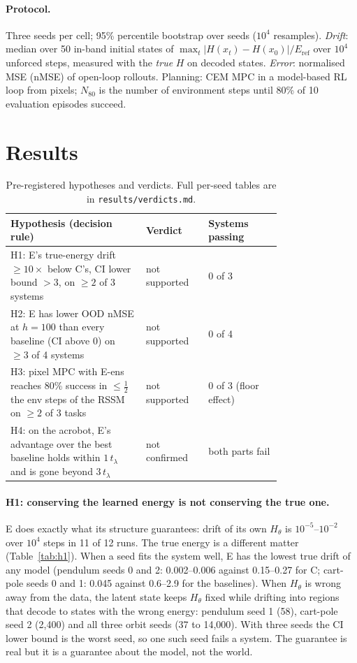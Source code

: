 \documentclass[10pt]{article}
\newcommand{\E}{\textsc{E}}
\begin{document}
\paragraph{Protocol.} Three seeds per cell; 95\% percentile bootstrap over seeds ($10^4$ resamples).
\emph{Drift}: median over 50 in-band initial states of $\max_t |H(x_t)-H(x_0)|/E_\text{ref}$ over $10^4$
unforced steps, measured with the \emph{true} $H$ on decoded states. \emph{Error}: normalised MSE (nMSE)
of open-loop rollouts. Planning: CEM \citep{deboer2005cem} MPC in a model-based RL loop from pixels;
$N_{80}$ is the number of environment steps until 80\% of 10 evaluation episodes succeed.

\section{Results}

\begin{table}[t]
\centering
\small
\caption{Pre-registered hypotheses and verdicts. Full per-seed tables are in \texttt{results/verdicts.md}.}
\label{tab:verdicts}
\begin{tabular}{@{}p{0.5\linewidth}lp{0.27\linewidth}@{}}
\toprule
Hypothesis (decision rule) & Verdict & Systems passing \\
\midrule
H1: \E's true-energy drift $\ge 10\times$ below C's, CI lower bound $>3$, on $\ge 2$ of 3 systems &
not supported & 0 of 3 \\
H2: \E{} has lower OOD nMSE at $h=100$ than every baseline (CI above 0) on $\ge 3$ of 4 systems &
not supported & 0 of 4 \\
H3: pixel MPC with \E-ens reaches 80\% success in $\le\tfrac12$ the env steps of the RSSM on $\ge 2$ of 3 tasks &
not supported & 0 of 3 (floor effect) \\
H4: on the acrobot, \E's advantage over the best baseline holds within $1\,t_\lambda$ and is gone beyond $3\,t_\lambda$ &
not confirmed & both parts fail \\
\bottomrule
\end{tabular}
\end{table}

\paragraph{H1: conserving the learned energy is not conserving the true one.} \E{} does exactly what its
structure guarantees: drift of its own $H_\theta$ is $10^{-5}$--$10^{-2}$ over $10^4$ steps in 11 of 12
runs. The true energy is a different matter (Table~\ref{tab:h1}). When a seed fits the system well, \E{}
has the lowest true drift of any model (pendulum seeds 0 and 2: 0.002--0.006 against 0.15--0.27 for C;
cart-pole seeds 0 and 1: 0.045 against 0.6--2.9 for the baselines). When $H_\theta$ is wrong away from
the data, the latent state keeps $H_\theta$ fixed while drifting into regions that decode to states with
the wrong energy: pendulum seed 1 (58), cart-pole seed 2 (2,400) and all three orbit seeds (37 to
14,000). With three seeds the CI lower bound is the worst seed, so one such seed fails a system. The
guarantee is real but it is a guarantee about the model, not the world.
\end{document}
